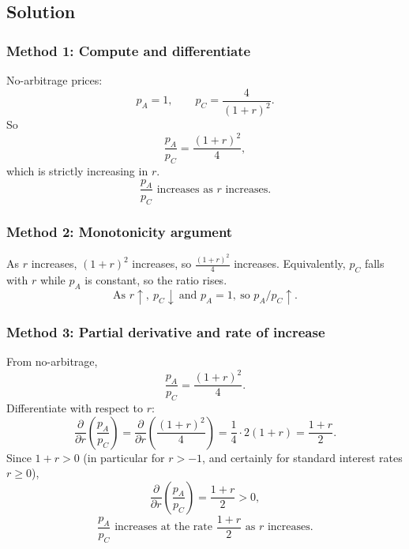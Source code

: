 \documentclass[12pt]{article}
\begin{document}
\subsection*{Solution}
\subsubsection*{Method 1: Compute and differentiate}
No-arbitrage prices:
\[
p_A=1,\qquad p_C=\frac{4}{(1+r)^2}.
\]
So
\[
\frac{p_A}{p_C}=\frac{(1+r)^2}{4},
\]
which is strictly increasing in \(r\).
\[
\boxed{\;\frac{p_A}{p_C}\text{ increases as }r\text{ increases.}\;}
\]

\subsubsection*{Method 2: Monotonicity argument}
As \(r\) increases, \((1+r)^2\) increases, so \(\frac{(1+r)^2}{4}\) increases. Equivalently, \(p_C\) falls with \(r\) while \(p_A\) is constant, so the ratio rises.
\[
\boxed{\;\text{As }r\uparrow,\ p_C\downarrow\ \text{and }p_A=1,\ \text{so }p_A/p_C\uparrow.\;}
\]

\subsubsection*{Method 3: Partial derivative and rate of increase}
From no-arbitrage,
\[
\frac{p_A}{p_C}=\frac{(1+r)^2}{4}.
\]
Differentiate with respect to \(r\):
\[
\frac{\partial}{\partial r}\left(\frac{p_A}{p_C}\right)
=\frac{\partial}{\partial r}\left(\frac{(1+r)^2}{4}\right)
=\frac{1}{4}\cdot 2(1+r)
=\frac{1+r}{2}.
\]
Since \(1+r>0\) (in particular for \(r>-1\), and certainly for standard interest rates \(r\ge 0\)),
\[
\frac{\partial}{\partial r}\left(\frac{p_A}{p_C}\right)=\frac{1+r}{2}>0,
\]
\[
\boxed{\; \frac{p_A}{p_C}
\text{ increases at the rate }
\frac{1+r}{2}\text{ as } r \text{ increases}.\;}
\]
\end{document}
